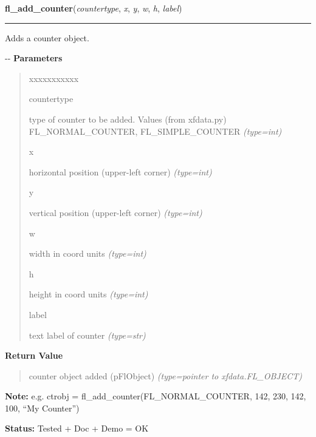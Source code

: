     \vspace{0.5ex}

\hspace{.8\funcindent}\begin{boxedminipage}{\funcwidth}

    \raggedright \textbf{fl\_add\_counter}(\textit{countertype}, \textit{x}, \textit{y}, \textit{w}, \textit{h}, \textit{label})

    \vspace{-1.5ex}

    \rule{\textwidth}{0.5\fboxrule}
\setlength{\parskip}{2ex}

Adds a counter object.

-{}-
\setlength{\parskip}{1ex}
      \textbf{Parameters}
      \vspace{-1ex}

      \begin{quote}
        \begin{Ventry}{xxxxxxxxxxx}

          \item[countertype]


type of counter to be added. Values (from xfdata.py) FL\_NORMAL\_COUNTER,
FL\_SIMPLE\_COUNTER
            {\it (type=int)}

          \item[x]


horizontal position (upper-left corner)
            {\it (type=int)}

          \item[y]


vertical position (upper-left corner)
            {\it (type=int)}

          \item[w]


width in coord units
            {\it (type=int)}

          \item[h]


height in coord units
            {\it (type=int)}

          \item[label]


text label of counter
            {\it (type=str)}

        \end{Ventry}

      \end{quote}

      \textbf{Return Value}
    \vspace{-1ex}

      \begin{quote}

counter object added (pFlObject)
      {\it (type=pointer to xfdata.FL\_OBJECT)}

      \end{quote}

\textbf{Note:} 
e.g. ctrobj = fl\_add\_counter(FL\_NORMAL\_COUNTER, 142, 230, 142,
100, ``My Counter'')


\textbf{Status:} 
Tested + Doc + Demo = OK


    \end{boxedminipage}

